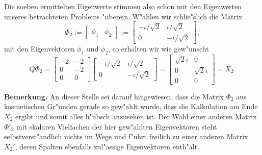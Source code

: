 Die soeben ermittelten Eigenwerte stimmen also schon mit den Eigenwerten
unseres betrachteten Problems "uberein. W"ahlen wir schlie"slich die Matrix
\[
\Phi_2 := \begin{bmatrix} \phi_1 & \phi_2 \end{bmatrix} :=
\begin{bmatrix} -\iota/\sqrt2  & \iota/\sqrt2 \\ 0 & -\iota/\sqrt2 \end{bmatrix},
\]
mit den Eigenvektoren $\phi_1$ und $\phi_2$, so erhalten wir wie gew"unscht
\[
Q\Phi_2 = \begin{bmatrix} -2 & -2 \\ 0 & -2\\0&0 \end{bmatrix}
\begin{bmatrix} -\iota/\sqrt2  & \iota/\sqrt2 \\ 0 & -\iota/\sqrt2 \end{bmatrix} =
\begin{bmatrix} \sqrt2 \iota & 0 \\ 0 & \sqrt2 \iota \\ 0 &0\end{bmatrix} = X_2.
\]

\textbf{Bemerkung.} An dieser Stelle sei darauf hingewiesen,
dass die Matrix $\Phi_2$ aus kosmetischen Gr"unden gerade so
gew"ahlt wurde, dass die Kalkulation am Ende $X_2$ ergibt und somit alles
h"ubsch anzusehen ist.
Der Wahl einer anderen Matrix $\Phi'_2$ mit skalaren Vielfachen der hier
gew"ahlten Eigenvektoren steht selbstverst"andlich nichts im Wege und f"uhrt freilich zu einer anderen
Matrix $X_2'$, deren Spalten ebenfalls zul"assige Eigenvektoren enth"alt.\\
